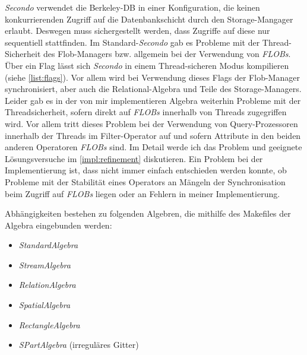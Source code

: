 \documentclass[a4paper,12pt,twoside]{article}
\newcommand{\Fb}[1]{\textit{#1}} %
\begin{document}
\Fb{Secondo} verwendet die Berkeley-DB in einer Konfiguration, die keinen konkurrierenden Zugriff auf die Datenbankschicht durch den Storage-Mangager erlaubt. Deswegen muss sichergestellt werden, dass Zugriffe auf diese nur sequentiell stattfinden. Im Standard-\Fb{Secondo} gab es Probleme mit der Thread-Sicherheit des Flob-Managers bzw. allgemein bei der Verwendung von \Fb{FLOBs}. Über ein Flag lässt sich \Fb{Secondo} in einem Thread-sicheren Modus kompilieren (siehe \autoref{list:flags}). Vor allem wird bei Verwendung dieses Flags der Flob-Manager synchronisiert, aber auch die Relational-Algebra und Teile des Storage-Managers. Leider gab es in der von mir implementieren Algebra weiterhin Probleme mit der Threadsicherheit, sofern direkt auf \Fb{FLOBs} innerhalb von Threads zugegriffen wird. Vor allem tritt dieses Problem bei der Verwendung von Query-Prozessoren innerhalb der Threads im Filter-Operator auf und sofern Attribute in den beiden anderen Operatoren \Fb{FLOBs} sind. Im Detail werde ich das Problem und geeignete Lösungsversuche im \autoref{impl:refinement} diskutieren. Ein Problem bei der Implementierung ist, dass nicht immer einfach entschieden werden konnte, ob Probleme mit der Stabilität eines Operators an Mängeln der Synchronisation beim Zugriff auf \Fb{FLOBs} liegen oder an Fehlern in meiner Implementierung.

Abhängigkeiten bestehen zu folgenden Algebren, die mithilfe des Makefiles der Algebra eingebunden werden:

\begin{itemize}
	\item \Fb{StandardAlgebra}
	\item \Fb{StreamAlgebra}
	\item \Fb{RelationAlgebra}
	\item \Fb{SpatialAlgebra}
	\item \Fb{RectangleAlgebra}
	\item \Fb{SPartAlgebra} (irreguläres Gitter)
\end{itemize}
\end{document}
